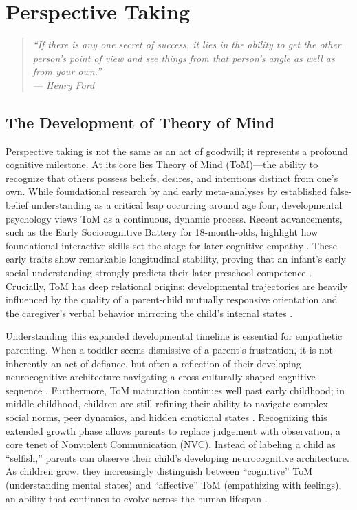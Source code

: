 \chapter{Perspective Taking}

\begin{quote}
\itshape ``If there is any one secret of success, it lies in the ability to get the other person's point of view and see things from that person's angle as well as from your own.''\\
\upshape --- Henry Ford
\end{quote}
\newpage

\section{The Development of Theory of Mind}

Perspective taking is not the same as an act of goodwill; it represents a profound cognitive milestone.
At its core lies Theory of Mind (ToM)---the ability to recognize that others possess beliefs, desires, and intentions distinct from one's own.
While foundational research by \citet{wimmer1983} and early meta-analyses by \citet{wellman2001} established false-belief understanding as a critical leap occurring around age four, developmental psychology views ToM as a continuous, dynamic process.
Recent advancements, such as the Early Sociocognitive Battery for 18-month-olds, highlight how foundational interactive skills set the stage for later cognitive empathy \citep{roy2024}.
These early traits show remarkable longitudinal stability, proving that an infant's early social understanding strongly predicts their later preschool competence \citep{sodian2024}.
Crucially, ToM has deep relational origins; developmental trajectories are heavily influenced by the quality of a parent-child mutually responsive orientation and the caregiver's verbal behavior mirroring the child's internal states \citep{kochanska2025, espinosa2025}.

Understanding this expanded developmental timeline is essential for empathetic parenting.
When a toddler seems dismissive of a parent's frustration, it is not inherently an act of defiance, but often a reflection of their developing neurocognitive architecture navigating a cross-culturally shaped cognitive sequence \citep{yu2024}.
Furthermore, ToM maturation continues well past early childhood; in middle childhood, children are still refining their ability to navigate complex social norms, peer dynamics, and hidden emotional states \citep{smogorzewska2024, osterhaus2024, lecce2024}.
Recognizing this extended growth phase allows parents to replace judgement with observation, a core tenet of Nonviolent Communication (NVC).
Instead of labeling a child as ``selfish,'' parents can observe their child's developing neurocognitive architecture.
As children grow, they increasingly distinguish between ``cognitive'' ToM (understanding mental states) and ``affective'' ToM (empathizing with feelings), an ability that continues to evolve across the human lifespan \citep{cornaggia2024}.

